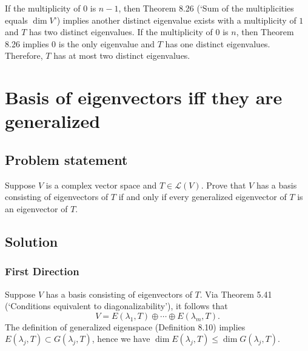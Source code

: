 \documentclass{article}
\begin{document}
If the multiplicity of $0$ is $n-1$, then Theorem 8.26 (`Sum of the multiplicities equals $\operatorname{dim}V$') implies another distinct eigenvalue exists with a multiplicity of $1$ and $T$ has two distinct eigenvalues. 
If the multiplicity of $0$ is $n$, then Theorem 8.26 implies $0$ is the only eigenvalue and $T$ has one distinct eigenvalues. 
Therefore, $T$ has at most two distinct eigenvalues.

\clearpage

\section{Basis of eigenvectors iff they are generalized}
\subsection*{Problem statement}
Suppose $V$ is a complex vector space and $T\in\mathcal{L}(V)$. 
Prove that $V$ has a basis consisting of eigenvectors of $T$ if and only if every generalized eigenvector of $T$ is an eigenvector of $T$.

\subsection*{Solution}
\subsubsection*{First Direction}
Suppose $V$ has a basis consisting of eigenvectors of $T$. Via Theorem 5.41 (`Conditions equivalent to diagonalizability'), it follows that 
\begin{equation}\label{eq:eigenspace_direct_sum}
    V=E(\lambda_1,T)\oplus\cdots\oplus E(\lambda_m,T).
\end{equation}
The definition of generalized eigenspace (Definition 8.10) implies 
\newline
$E(\lambda_j,T)\subset G(\lambda_j,T)$, hence we have $\operatorname{dim}E(\lambda_j,T)\leq \operatorname{dim}G(\lambda_j,T)$. 
\end{document}
